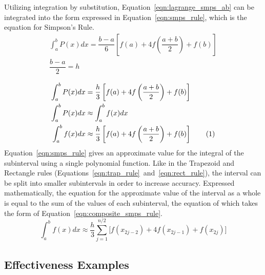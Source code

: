 \documentclass{paper}
\newcommand*\tageq{\refstepcounter{equation}\tag{\theequation}}
\begin{document}
%
Utilizing integration by substitution, Equation~\ref{eqn:lagrange_smps_ab} can be integrated into the form expressed in Equation~\ref{eqn:smps_rule}, which is the equation for Simpson's Rule.
%
\begin{gather*}
    \int_a^b P(x) dx = \dfrac{b - a}{6} \left[f(a) + 4f\left(\dfrac{a + b}{2}\right) + f(b)\right]                                  \\
    \dfrac{b - a}{2} = h                                                                                                            \\
\end{gather*}
\vspace*{-1.2cm}
\begin{align*}
    \int_a^b P(x) dx &= \dfrac{h}{3} \left[f(a) + 4f\left(\dfrac{a + b}{2}\right) + f(b)\right]                                     \\
    \int_a^b P(x) dx &\approx \int_a^b f(x) dx                                                                                      \\
    \int_a^b f(x) dx &\approx \dfrac{h}{3} \left[f(a) + 4f\left(\dfrac{a + b}{2}\right) + f(b)\right]  \tageq\label{eqn:smps_rule}
\end{align*}
%
Equation~\ref{eqn:smps_rule} gives an approximate value for the integral of the subinterval using a single polynomial function.
Like in the Trapezoid and Rectangle rules (Equations~\ref{eqn:trap_rule}~and~\ref{eqn:rect_rule}), the interval can be split into smaller subintervals in order to increase accuracy.
Expressed mathematically, the equation for the approximate value of the interval as a whole is equal to the sum of the values of each subinterval, the equation of which takes the form of Equation~\ref{eqn:composite_smps_rule}.
%
\begin{equation}
    \label{eqn:composite_smps_rule}
    \int_a^b f(x) dx \approx \dfrac{h}{3} \sum_{j=1}^{n / 2} \biggl[f(x_{2j-2}) + 4f(x_{2j-1}) + f(x_{2j})\biggr]
\end{equation}
%
%
%
\subsection{Effectiveness Examples}
\end{document}

